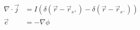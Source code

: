 \begin{equation}
\begin{split}
\nabla \cdot \vec{j} &= I\left(\delta(\vec{r} - \vec{r}_{s^{+}}) - \delta(\vec{r} - \vec{r}_{s^{-}})\right) \\
\vec{e} &= - \nabla \phi
\end{split}
\label{eq:DCequations}
\end{equation}
